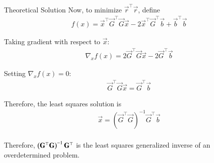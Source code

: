 \documentclass{beamer}
\begin{document}
\begin{frame}{Theoretical Solution}
Now, to minimize \(\vec{r}^{\top}\vec{r}\), define
\begin{align}
f(x) = \vec{x}^{\top}\vec{G}^{\top}\vec{G}\vec{x} - 2\vec{x}^{\top}\vec{G}^{\top}\vec{b} + \vec{b} ^{\top}\vec{b} 
\end{align}

Taking gradient with respect to \(\vec{x}\):
\begin{align}
\nabla_x f(x) = 2\vec{G}^{\top}\vec{G}\vec{x} - 2\vec{G}^{\top}\vec{b} 
\end{align}

Setting \(\nabla_x f(x) = 0\):
\begin{align}
\vec{G}^{\top}\vec{G}\vec{x} = \vec{G}^{\top}\vec{b} 
\end{align}

Therefore, the least squares solution is
\begin{align}
\vec{x} = \boxed{(\vec{G}^{\top}\vec{G})^{-1}\vec{G}^{\top}\vec{b} }
\end{align}\\
Therefore, $\left(\mathbf{G}^{\top}\mathbf{G}\right)^{-1}\mathbf{G}^{\top}$ is the least squares generalized inverse of an overdetermined problem.
\end{frame}
\end{document}
